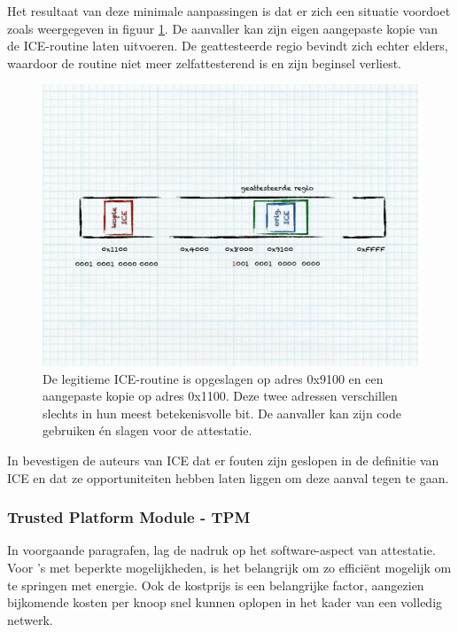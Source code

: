 Het resultaat van deze minimale aanpassingen is dat er zich een situatie
voordoet zoals weergegeven in figuur \ref{fig:attestation-ice-copy}. De
aanvaller kan zijn eigen aangepaste kopie van de ICE-routine laten uitvoeren.
De geattesteerde regio bevindt zich echter elders, waardoor de routine niet
meer zelfattesterend is en zijn beginsel verliest.

\begin{figure}[ht]
  \centering
  \includegraphics[width=0.9\linewidth]{resources/attestation-ice-copy.pdf}
  \caption[Omzeilen van ICE-gebaseerde software-attestatie]{De legitieme
  ICE-routine is opgeslagen op adres 0x9100 en een aangepaste kopie op adres
  0x1100. Deze twee adressen verschillen slechts in hun meest betekenisvolle
  bit. De aanvaller kan zijn code gebruiken \'en slagen voor de attestatie.}
  \label{fig:attestation-ice-copy}
\end{figure}

In \citep{perrig2010refutation} bevestigen de auteurs van ICE dat er fouten
zijn geslopen in de definitie van ICE en dat ze opportuniteiten hebben laten
liggen om deze aanval tegen te gaan.

\subsubsection*{Trusted Platform Module - TPM}

In voorgaande paragrafen, lag de nadruk op het software-aspect van attestatie.
Voor \mcu's met beperkte mogelijkheden, is het belangrijk om zo effici\"ent
mogelijk om te springen met energie. Ook de kostprijs is een belangrijke
factor, aangezien bijkomende kosten per knoop snel kunnen oplopen in het kader
van een volledig netwerk.

